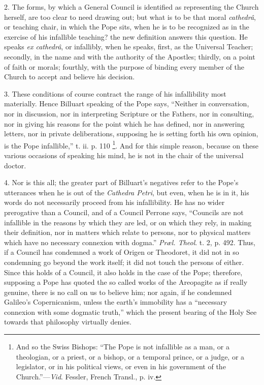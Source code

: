 2. The forms, by which a General Council is identified as
representing the Church herself, are too clear to need drawing out; but
what is to be that moral \emph{cathedrâ}, or teaching chair, in which
the Pope sits, when he is to be recognized as in the exercise of his
infallible teaching? the new definition answers this question. He speaks
\emph{ex cathedrâ}, or infallibly, when he speaks, first, as the
Universal Teacher; secondly, in the name and with the authority of the
Apostles; thirdly, on a point of faith or morals; fourthly, with the
purpose of binding every member of the Church to accept and believe his
decision.

3. These conditions of course contract the range of his infallibility
most materially. Hence Billuart speaking of the Pope says, ``Neither
in conversation, nor in discussion, nor in interpreting Scripture or the
Fathers, nor in consulting, nor in giving his reasons for the point
which he has defined, nor in answering letters, nor in private
deliberations, supposing he is setting forth his own opinion, is the
Pope infallible,'' t. ii. p. 110 \footnote{And so the Swiss Bishops: ``The Pope is not infallible as a
man, or a theologian, or a priest, or a bishop, or a temporal prince, or
a judge, or a legislator, or in his political views, or even in his
government of the Church.''—\emph{Vid}. Fessler, French Transl.,
p. iv.}. And for this simple
reason, because on these various occasions of speaking his mind, he is
not in the chair of the universal doctor.

4. Nor is this all; the greater part of Billuart's negatives refer to the Pope's utterances when he is out of the \emph{Cathedra Petri},
but even, when he is in it, his words do not necessarily proceed from
his infallibility. He has no wider prerogative than a Council, and of a
Council Perrone says, ``Councils are not infallible in the reasons
by which they are led, or on which they rely, in making their
definition, nor in matters which relate to persons, nor to physical
matters which have no necessary connexion with dogma.'' \emph{Præl.
Theol}. t. 2, p. 492. Thus, if a Council has condemned a work of
Origen or Theodoret, it did not in so condemning go beyond the work
itself; it did not touch the persons of either. Since this holds of a
Council, it also holds in the case of the Pope; therefore, supposing a
Pope has quoted the so called works of the Areopagite as if really
genuine, there is no call on us to believe him; nor again, if he
condemned Galileo's Copernicanism, unless the earth's immobility has a
``necessary connexion with some dogmatic truth,'' which the
present bearing of the Holy See towards that philosophy virtually
denies.

